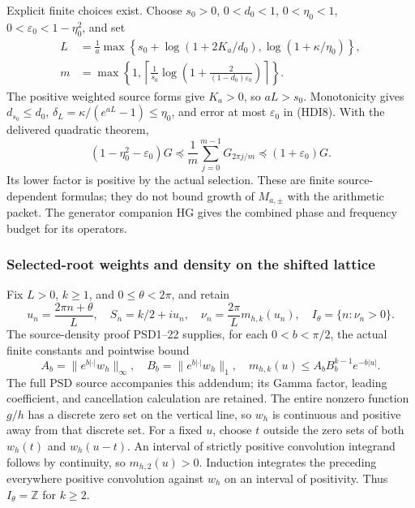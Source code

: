 Explicit finite choices exist. Choose \(s_0>0\), \(0<d_0<1\),
\(0<\eta_0<1\), \(0<\varepsilon_0<1-\eta_0^2\), and set
\[
 \begin{split}
 L&=\frac1a\max\left\{s_0+\log(1+2K_a/d_0),
                         \log(1+\kappa/\eta_0)\right\},\\
 m&=\max\left\{1,\left\lceil\frac1{s_0}
 \log\left(1+\frac{2}{(1-d_0)\varepsilon_0}\right)\right\rceil\right\}.
 \end{split}
 \tag{HDI9}
\]
The positive weighted source forms give \(K_a>0\), so \(aL>s_0\).
Monotonicity gives \(d_{s_0}\le d_0\),
\(\delta_L=\kappa/(e^{aL}-1)\le\eta_0\), and error at most
\(\varepsilon_0\) in (HDI8). With the delivered quadratic theorem,
\[
 (1-\eta_0^2-\varepsilon_0)G
 \preceq \frac1m\sum_{j=0}^{m-1}G_{2\pi j/m}
 \preceq(1+\varepsilon_0)G.
 \tag{HDI10}
\]
Its lower factor is positive by the actual selection. These are
finite source-dependent formulas; they do not bound growth of
\(M_{a,\pm}\) with the arithmetic packet. The generator companion
HG gives the combined phase and frequency budget for its operators.

\subsubsection{Selected-root weights and density on the shifted lattice}
Fix \(L>0\), \(k\ge1\), and \(0\le\theta<2\pi\), and retain
\[
 u_n=\frac{2\pi n+\theta}{L},\quad S_n=k/2+iu_n,\quad
 \nu_n=\frac{2\pi}{L}m_{h,k}(u_n),\quad
 I_\theta=\{n:\nu_n>0\}.
 \tag{HDI11}
\]
The source-density proof PSD1--22 supplies, for each
\(0<b<\pi/2\), the actual finite constants and pointwise bound
\[
 A_b=\|e^{b|\cdot|}w_h\|_\infty,\quad
 B_b=\|e^{b|\cdot|}w_h\|_1,\quad
 m_{h,k}(u)\le A_bB_b^{k-1}e^{-b|u|}.
 \tag{HDI12}
\]
The full PSD source accompanies this addendum; its Gamma factor,
leading coefficient, and cancellation calculation are retained.
The entire nonzero function \(g/h\) has a discrete zero set on
the vertical line, so \(w_h\) is continuous and positive away
from that discrete set. For a fixed \(u\), choose \(t\) outside
the zero sets of both \(w_h(t)\) and \(w_h(u-t)\). An interval
of strictly positive convolution integrand follows by continuity,
so \(m_{h,2}(u)>0\). Induction integrates the preceding everywhere
positive convolution against \(w_h\) on an interval of positivity.
Thus \(I_\theta=\mathbb Z\) for \(k\ge2\).

